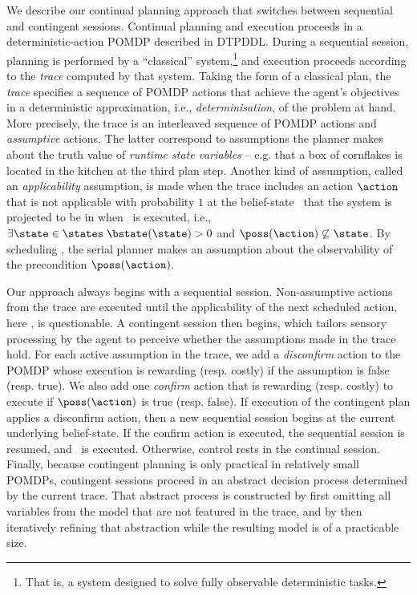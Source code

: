 

We describe our continual planning approach that switches between
sequential and contingent sessions. Continual planning and execution
proceeds in a deterministic-action POMDP described in DTPDDL. During a
sequential session, planning is performed by a ``classical''
system,\footnote{That is, a system designed to solve fully observable
deterministic tasks.}  and execution proceeds according to the {\em
trace} computed by that system. Taking the form of a classical plan,
the {\em trace} specifies a sequence of POMDP actions that achieve the
agent's objectives in a deterministic approximation, i.e., {\em
determinisation}, of the problem at hand. More precisely, the trace is
an interleaved sequence of POMDP actions and {\em assumptive}
actions. The latter correspond to assumptions the planner makes about
the truth value of {\em runtime state variables} -- e.g. that a box of
cornflakes is located in the kitchen at the third plan step. Another
kind of assumption, called an {\em applicability} assumption, is made
when the trace includes an action $\action$ that is not applicable
with probability $1$ at the belief-state
\bstate\ that the system is projected to be in when \action\ is executed, 
i.e., $\exists\state\in\states\;
\bstate(\state) > 0$ and $\poss(\action)\not\subseteq\state$. By
scheduling
\action,  the serial planner makes an assumption about the
observability of the precondition $\poss(\action)$.

Our approach always begins with a sequential session. Non-assumptive
actions from the trace are executed until the applicability of the
next scheduled action, here \action, is questionable. A contingent
session then begins, which tailors sensory processing by the agent to
perceive whether the assumptions made in the trace hold. For each
active assumption in the trace, we add a {\em disconfirm} action to
the POMDP whose execution is rewarding (resp. costly) if the
assumption is false (resp. true). We also add one {\em confirm} action
that is rewarding (resp. costly) to execute if $\poss(\action)$ is
true (resp. false). If execution of the contingent plan applies a
disconfirm action, then a new sequential session begins at the current
underlying belief-state. If the confirm action is executed, the
sequential session is resumed, and \action\ is executed. Otherwise,
control rests in the continual session.
Finally, because contingent planning is only practical in relatively
small POMDPs, contingent sessions proceed in an abstract decision
process determined by the current trace. That abstract process is
constructed by first omitting all variables from the model that are
not featured in the trace, and by then iteratively refining that
abstraction while the resulting model is of a practicable size.


